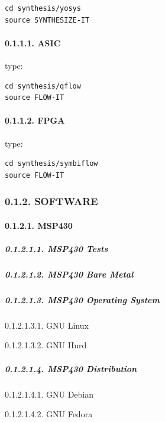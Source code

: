 \documentclass[
]{article}
\begin{document}
\begin{verbatim}
cd synthesis/yosys
source SYNTHESIZE-IT
\end{verbatim}

\hypertarget{asic-1}{%
\paragraph{0.1.1.1. ASIC}\label{asic-1}}

type:

\begin{verbatim}
cd synthesis/qflow
source FLOW-IT
\end{verbatim}

\hypertarget{fpga-1}{%
\paragraph{0.1.1.2. FPGA}\label{fpga-1}}

type:

\begin{verbatim}
cd synthesis/symbiflow
source FLOW-IT
\end{verbatim}

\hypertarget{software-1}{%
\subsubsection{0.1.2. SOFTWARE}\label{software-1}}

\hypertarget{msp430-3}{%
\paragraph{0.1.2.1. MSP430}\label{msp430-3}}

\hypertarget{msp430-tests-1}{%
\subparagraph{0.1.2.1.1. MSP430 Tests}\label{msp430-tests-1}}

\hypertarget{msp430-bare-metal-1}{%
\subparagraph{0.1.2.1.2. MSP430 Bare Metal}\label{msp430-bare-metal-1}}

\hypertarget{msp430-operating-system-1}{%
\subparagraph{0.1.2.1.3. MSP430 Operating
System}\label{msp430-operating-system-1}}

0.1.2.1.3.1. GNU Linux

0.1.2.1.3.2. GNU Hurd

\hypertarget{msp430-distribution-1}{%
\subparagraph{0.1.2.1.4. MSP430
Distribution}\label{msp430-distribution-1}}

0.1.2.1.4.1. GNU Debian

0.1.2.1.4.2. GNU Fedora
\end{document}
